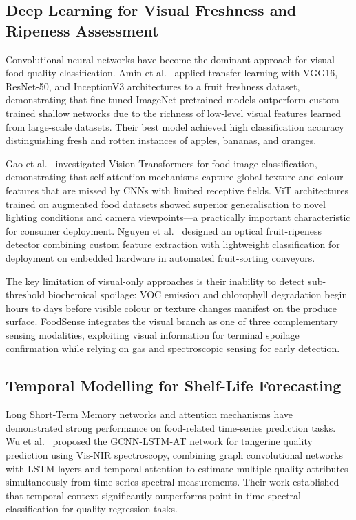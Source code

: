 \documentclass{ieeeaccess}
\begin{document}
\subsection{Deep Learning for Visual Freshness and Ripeness Assessment}

Convolutional neural networks have become the dominant approach for visual food quality classification. Amin et al.~\cite{Amin2023} applied transfer learning with VGG16, ResNet-50, and InceptionV3 architectures to a fruit freshness dataset, demonstrating that fine-tuned ImageNet-pretrained models outperform custom-trained shallow networks due to the richness of low-level visual features learned from large-scale datasets. Their best model achieved high classification accuracy distinguishing fresh and rotten instances of apples, bananas, and oranges.

Gao et al.~\cite{Gao2024} investigated Vision Transformers for food image classification, demonstrating that self-attention mechanisms capture global texture and colour features that are missed by CNNs with limited receptive fields. ViT architectures trained on augmented food datasets showed superior generalisation to novel lighting conditions and camera viewpoints---a practically important characteristic for consumer deployment. Nguyen et al.~\cite{Nguyen2024} designed an optical fruit-ripeness detector combining custom feature extraction with lightweight classification for deployment on embedded hardware in automated fruit-sorting conveyors.

The key limitation of visual-only approaches is their inability to detect sub-threshold biochemical spoilage: VOC emission and chlorophyll degradation begin hours to days before visible colour or texture changes manifest on the produce surface. FoodSense integrates the visual branch as one of three complementary sensing modalities, exploiting visual information for terminal spoilage confirmation while relying on gas and spectroscopic sensing for early detection.

\subsection{Temporal Modelling for Shelf-Life Forecasting}

Long Short-Term Memory networks and attention mechanisms have demonstrated strong performance on food-related time-series prediction tasks. Wu et al.~\cite{Wu2023} proposed the GCNN-LSTM-AT network for tangerine quality prediction using Vis-NIR spectroscopy, combining graph convolutional networks with LSTM layers and temporal attention to estimate multiple quality attributes simultaneously from time-series spectral measurements. Their work established that temporal context significantly outperforms point-in-time spectral classification for quality regression tasks.
\end{document}
